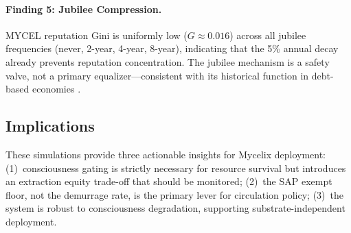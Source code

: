 \paragraph{Finding 5: Jubilee Compression.}
MYCEL reputation Gini is uniformly low ($G \approx 0.016$) across all jubilee frequencies
(never, 2-year, 4-year, 8-year), indicating that the 5\% annual decay already prevents
reputation concentration. The jubilee mechanism is a safety valve, not a primary
equalizer---consistent with its historical function in debt-based economies
\citep{hudson2018}.

\subsection{Implications}

These simulations provide three actionable insights for Mycelix deployment:
(1)~consciousness gating is strictly necessary for resource survival but introduces an
extraction equity trade-off that should be monitored;
(2)~the SAP exempt floor, not the demurrage rate, is the primary lever for circulation
policy;
(3)~the system is robust to consciousness degradation, supporting substrate-independent
deployment.
